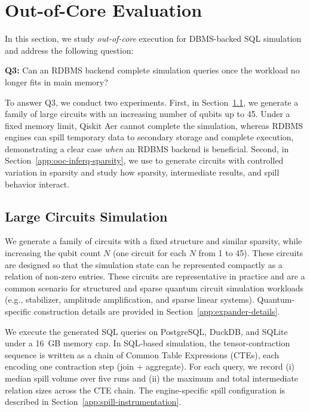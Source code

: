 \section{Out-of-Core Evaluation}
\label{app:qft-cap-sensitivity}

In this section, we study \emph{out-of-core} execution for DBMS-backed SQL simulation and
address the following question:

\smallskip
\noindent\textbf{Q3:} Can an RDBMS backend complete simulation queries once the workload no
longer fits in main memory?

\smallskip
To answer Q3, we conduct two experiments. First, in
Section~\ref{app:ooc-expander}, we generate a family of large circuits with an increasing number of qubits up to 45. Under a fixed memory limit, Qiskit Aer cannot complete the simulation, whereas RDBMS engines can spill
temporary data to secondary storage and complete execution, demonstrating a clear case
\emph{when} an RDBMS backend is beneficial. Second, in
Section~\ref{app:ooc-inferq-sparsity}, we use \sys to generate circuits with controlled
variation in sparsity and study how sparsity, intermediate results, and spill behavior
interact.

\subsection{Large Circuits Simulation}
\label{app:ooc-expander}



We generate a family of circuits with a fixed structure and similar sparsity, while
increasing the qubit count $N$ (one circuit for each $N$ from 1 to 45). These circuits
are designed so that the simulation state can be represented compactly as a relation of
non-zero entries. These circuits are representative in practice and are a common scenario for structured and sparse quantum circuit simulation workloads (e.g., stabilizer, amplitude amplification, and sparse linear systems). 
Quantum-specific construction details are provided in Section~\ref{app:expander-details}.

We execute the generated SQL queries on PostgreSQL, DuckDB, and SQLite under a 16~GB memory cap. In SQL-based simulation, the tensor-contraction sequence is written as a chain of Common Table Expressions (CTEs), each encoding one contraction step (join + aggregate). 
For each query, we record (i) median spill volume over five runs and (ii) the
maximum and total intermediate relation sizes across the CTE chain. The engine-specific
spill configuration is described in
Section~\ref{app:spill-instrumentation}.


